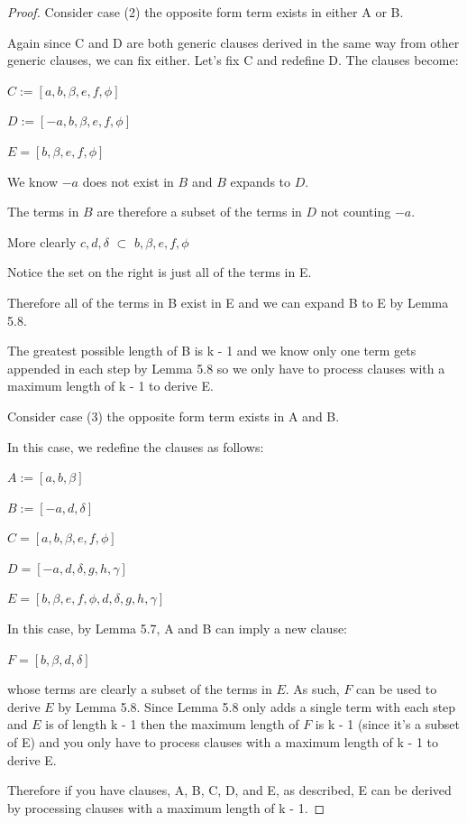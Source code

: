 \documentclass[manuscript]{acmart}
\begin{document}
\begin{proof}
        Consider case (2) the opposite form term exists in either A or B.

        Again since C and D are both generic clauses derived in the same
        way from other generic clauses, we can fix either. Let's fix C
        and redefine D. The clauses become:

        $C := [a, b, \beta, e, f, \phi]$

        $D := [-a, b, \beta, e, f, \phi]$

        $E = [b, \beta, e, f, \phi]$

        We know $-a$ does not exist in $B$ and $B$ expands to $D$.

        The terms in $B$ are therefore a subset of the terms in $D$ not counting
        $-a$.

        More clearly {$c, d, \delta$} $\subset$ {$b, \beta, e, f, \phi$}

        Notice the set on the right is just all of the terms in E.

        Therefore all of the terms in B exist in E and we can expand
        B to E by Lemma 5.8.

        The greatest possible length of B is k - 1 and we know only one
        term gets appended in each step by Lemma 5.8 so we only have to
        process clauses with a maximum length of k - 1 to derive E.

        Consider case (3) the opposite form term exists in A and B.

        In this case, we redefine the clauses as follows:

        $A := [a, b, \beta]$

        $B := [-a, d, \delta]$

        $C = [a, b, \beta, e, f, \phi]$

        $D = [-a, d, \delta, g, h, \gamma]$

        $E = [b, \beta, e, f, \phi, d, \delta, g, h, \gamma]$

        In this case, by Lemma 5.7, A and B can imply a new clause:

        $F = [b, \beta, d, \delta]$

        whose terms are clearly a subset of the terms in $E$. As such, 
        $F$ can be used to derive $E$ by Lemma 5.8. Since Lemma 5.8 only
        adds a single term with each step and $E$ is of length k - 1 then
        the maximum length of $F$ is k - 1 (since it's a subset of E) and 
        you only have to process clauses with a maximum length of k - 1
        to derive E. 

        Therefore if you have clauses, A, B, C, D, and E, as described,
        E can be derived by processing clauses with a maximum length
        of k - 1.
    \end{proof}
\end{document}
